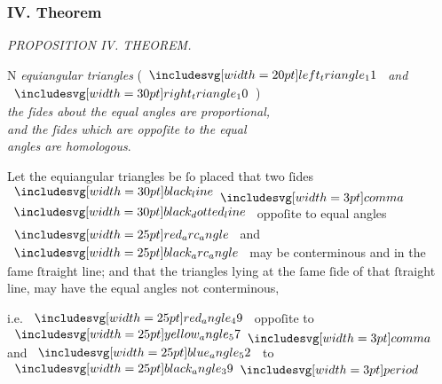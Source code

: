 \documentclass[12pt,preview]{standalone}
\begin{document}
\subsubsection{IV. Theorem}

\begin{minipage}[t]{0.33\textwidth}
    \vspace{40pt}
    
\end{minipage}%
\hfill
\begin{minipage}[t]{0.64\textwidth}
    \vspace{0pt}

    \begin{center}
        \textit{PROPOSITION IV. THEOREM.}\label{book6pr4} \\
    \end{center}

    \hfill

    \begin{center}
        \raggedright \lettrine[lines=4, loversize=1, nindent=0pt]{}{}N \textit{equiangular triangles} (\hspace{-1ex}$\img[0][0][20]{left_triangle_11}$ \textit{and} $\img[0][0][30]{right_triangle_10}$\hspace{-1ex})\\ \textit{the ſides about the equal angles are proportional,\\ and the ſides which are oppoſite to the equal\\ angles are homologous}.
    \end{center}

    \hfill

    \hfill

    \raggedright Let the equiangular triangles be ſo placed that two ſides $\blackline \bcomma$\\
    $\dottedblackline$ oppoſite to equal angles $\img{red_arc_angle}$ and $\img{black_arc_angle}$ may be conterminous and in the ſame ſtraight line; and that the triangles lying at the ſame ſide of that ſtraight line, may have the equal angles not conterminous,

    \hfill

    \begin{center}
        i.e. $\img{red_angle_49}$ oppoſite to $\img{yellow_angle_57} \bcomma$ and $\img{blue_angle_52}$ to $\img{black_angle_39} \bperiod$
    \end{center}


\end{minipage}
\end{document}
